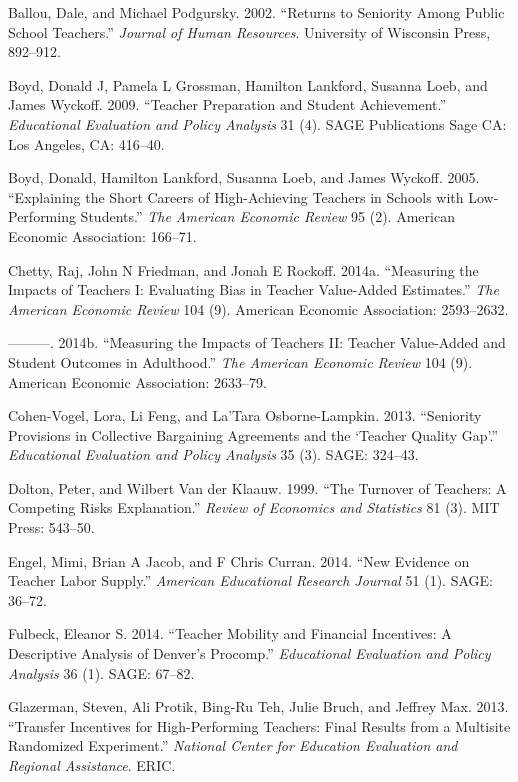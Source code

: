 \documentclass[12pt,]{article}
\begin{document}
\hypertarget{ref-ballou}{}
Ballou, Dale, and Michael Podgursky. 2002. ``Returns to Seniority Among
Public School Teachers.'' \emph{Journal of Human Resources}. University
of Wisconsin Press, 892--912.

\hypertarget{ref-boyd2009}{}
Boyd, Donald J, Pamela L Grossman, Hamilton Lankford, Susanna Loeb, and
James Wyckoff. 2009. ``Teacher Preparation and Student Achievement.''
\emph{Educational Evaluation and Policy Analysis} 31 (4). SAGE
Publications Sage CA: Los Angeles, CA: 416--40.

\hypertarget{ref-boyd2005}{}
Boyd, Donald, Hamilton Lankford, Susanna Loeb, and James Wyckoff. 2005.
``Explaining the Short Careers of High-Achieving Teachers in Schools
with Low-Performing Students.'' \emph{The American Economic Review} 95
(2). American Economic Association: 166--71.

\hypertarget{ref-chettyI}{}
Chetty, Raj, John N Friedman, and Jonah E Rockoff. 2014a. ``Measuring
the Impacts of Teachers I: Evaluating Bias in Teacher Value-Added
Estimates.'' \emph{The American Economic Review} 104 (9). American
Economic Association: 2593--2632.

\hypertarget{ref-chettyII}{}
---------. 2014b. ``Measuring the Impacts of Teachers II: Teacher
Value-Added and Student Outcomes in Adulthood.'' \emph{The American
Economic Review} 104 (9). American Economic Association: 2633--79.

\hypertarget{ref-cohenvogel}{}
Cohen-Vogel, Lora, Li Feng, and La'Tara Osborne-Lampkin. 2013.
``Seniority Provisions in Collective Bargaining Agreements and the
`Teacher Quality Gap'.'' \emph{Educational Evaluation and Policy
Analysis} 35 (3). SAGE: 324--43.

\hypertarget{ref-dolton}{}
Dolton, Peter, and Wilbert Van der Klaauw. 1999. ``The Turnover of
Teachers: A Competing Risks Explanation.'' \emph{Review of Economics and
Statistics} 81 (3). MIT Press: 543--50.

\hypertarget{ref-engel}{}
Engel, Mimi, Brian A Jacob, and F Chris Curran. 2014. ``New Evidence on
Teacher Labor Supply.'' \emph{American Educational Research Journal} 51
(1). SAGE: 36--72.

\hypertarget{ref-fulbeck}{}
Fulbeck, Eleanor S. 2014. ``Teacher Mobility and Financial Incentives: A
Descriptive Analysis of Denver's Procomp.'' \emph{Educational Evaluation
and Policy Analysis} 36 (1). SAGE: 67--82.

\hypertarget{ref-glazerman}{}
Glazerman, Steven, Ali Protik, Bing-Ru Teh, Julie Bruch, and Jeffrey
Max. 2013. ``Transfer Incentives for High-Performing Teachers: Final
Results from a Multisite Randomized Experiment.'' \emph{National Center
for Education Evaluation and Regional Assistance}. ERIC.
\end{document}
